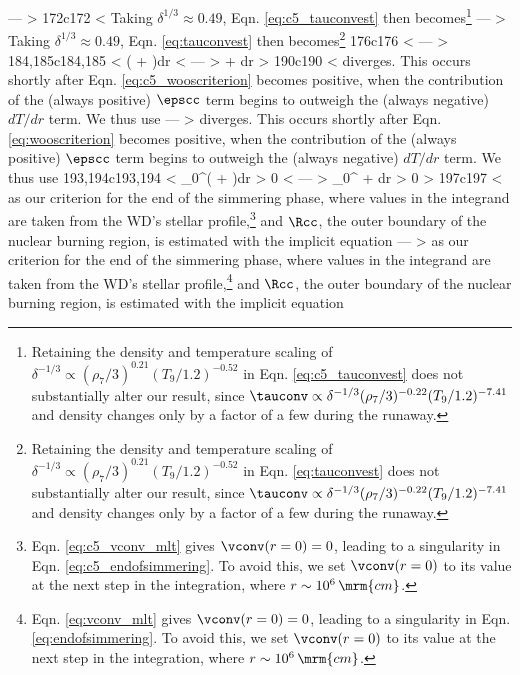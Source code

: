 ---
> \label{eq:taudyn}
172c172
< \noindent Taking $\delta^{1/3} \approx 0.49$, Eqn. \ref{eq:c5_tauconvest} then becomes\footnote{Retaining the density and temperature scaling of $\delta^{-1/3} \propto (\rho_7/3)^{0.21}(T_9/1.2)^{-0.52}$ in Eqn. \ref{eq:c5_tauconvest} does not substantially alter our result, since $\tauconv \propto \delta^{-1/3}(\rho_7/3)^{-0.22}(T_9/1.2)^{-7.41}$ and density changes only by a factor of a few during the runaway.}
---
> \noindent Taking $\delta^{1/3} \approx 0.49$, Eqn. \ref{eq:tauconvest} then becomes\footnote{Retaining the density and temperature scaling of $\delta^{-1/3} \propto (\rho_7/3)^{0.21}(T_9/1.2)^{-0.52}$ in Eqn. \ref{eq:tauconvest} does not substantially alter our result, since $\tauconv \propto \delta^{-1/3}(\rho_7/3)^{-0.22}(T_9/1.2)^{-7.41}$ and density changes only by a factor of a few during the runaway.}
176c176
< \label{eq:c5_tauconvest2}
---
> \label{eq:tauconvest2}
184,185c184,185
< \int\left( + \right)dr
< \label{eq:c5_wooscriterion}
---
> \int{} + dr
> \label{eq:wooscriterion}
190c190
< \noindent diverges.  This occurs shortly after Eqn. \ref{eq:c5_wooscriterion} becomes positive, when the contribution of the (always positive) $\epscc$ term begins to outweigh the (always negative) $dT/dr$ term.  We thus use
---
> \noindent diverges.  This occurs shortly after Eqn. \ref{eq:wooscriterion} becomes positive, when the contribution of the (always positive) $\epscc$ term begins to outweigh the (always negative) $dT/dr$ term.  We thus use
193,194c193,194
< \int_0^{\Rcc}\left( + \right)dr > 0
< \label{eq:c5_endofsimmering}
---
> \int_0^{\Rcc} + dr > 0
> \label{eq:endofsimmering}
197c197
< \noindent as our criterion for the end of the simmering phase, where values in the integrand are taken from the WD's stellar profile,\footnote{Eqn. \ref{eq:c5_vconv_mlt} gives $\vconv(r = 0) = 0$, leading to a singularity in Eqn. \ref{eq:c5_endofsimmering}.  To avoid this, we set $\vconv(r = 0)$ to its value at the next step in the integration, where $r \sim 10^6\,\mrm{cm}$.} and $\Rcc$, the outer boundary of the nuclear burning region, is estimated with the implicit equation
---
> \noindent as our criterion for the end of the simmering phase, where values in the integrand are taken from the WD's stellar profile,\footnote{Eqn. \ref{eq:vconv_mlt} gives $\vconv(r = 0) = 0$, leading to a singularity in Eqn. \ref{eq:endofsimmering}.  To avoid this, we set $\vconv(r = 0)$ to its value at the next step in the integration, where $r \sim 10^6\,\mrm{cm}$.} and $\Rcc$, the outer boundary of the nuclear burning region, is estimated with the implicit equation
